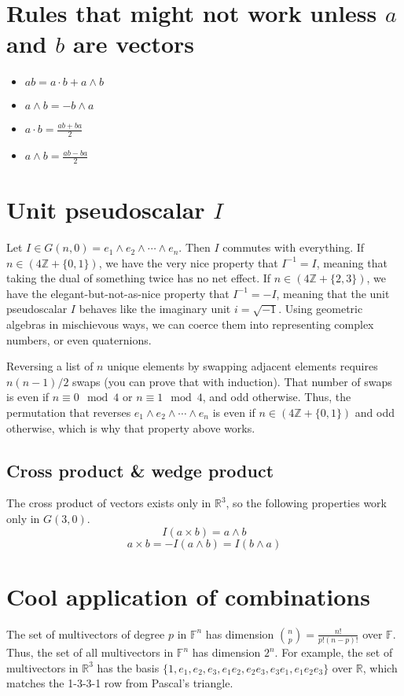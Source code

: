 \documentclass[12pt]{article}
\begin{document}
\section{Rules that might not work unless $a$ and $b$ are vectors}
\begin{itemize}
    \item $ab = a \cdot b + a \wedge b$
    \item $a \wedge b = - b \wedge a$
    \item $a \cdot b = \frac{ab + ba}{2} $
    \item $a \wedge b = \frac{ab - ba}{2}$
\end{itemize}

\section{Unit pseudoscalar $I$}
Let $I \in G(n, 0) = e_1 \wedge e_2 \wedge \cdots \wedge e_n$. Then $I$ commutes with everything. If $n \in (4 \mathbb{Z} + \{0, 1\})$, we have the very nice property that $I^{-1} = I$, meaning that taking the dual of something twice has no net effect. If $n \in (4 \mathbb{Z} + \{2, 3\})$, we have the elegant-but-not-as-nice property that $I^{-1} = -I$, meaning that the unit pseudoscalar $I$ behaves like the imaginary unit $i = \sqrt{-1}$. Using geometric algebras in mischievous ways, we can coerce them into representing complex numbers, or even quaternions.

Reversing a list of $n$ unique elements by swapping adjacent elements requires $n(n-1)/2$ swaps (you can prove that with induction). That number of swaps is even if $n \equiv 0 \mod{4}$ or $n \equiv 1 \mod{4}$, and odd otherwise. Thus, the permutation that reverses $e_1 \wedge e_2 \wedge \cdots \wedge e_n$ is even if $n \in (4 \mathbb{Z} + \{0, 1\})$ and odd otherwise, which is why that property above works.

\subsection{Cross product \& wedge product}
The cross product of vectors exists only in $\mathbb{R}^3$, so the following properties work only in $G(3, 0)$.
\[I (a \times b) = a \wedge b\]
\[a \times b = -I (a \wedge b) = I (b \wedge a)\]


\section{Cool application of combinations}
The set of multivectors of degree $p$ in $\mathbb{F}^n$ has dimension ${n \choose p} = \frac{n!}{p!(n-p)!} $ over $\mathbb{F}$. Thus, the set of all multivectors in $\mathbb{F}^n$ has dimension $2^n$. For example, the set of multivectors in $\mathbb{R}^3$ has the basis $\{1, e_1, e_2, e_3, e_1 e_2, e_2 e_3, e_3 e_1, e_1 e_2 e_3\}$ over $\mathbb{R}$, which matches the 1-3-3-1 row from Pascal's triangle.
\end{document}
